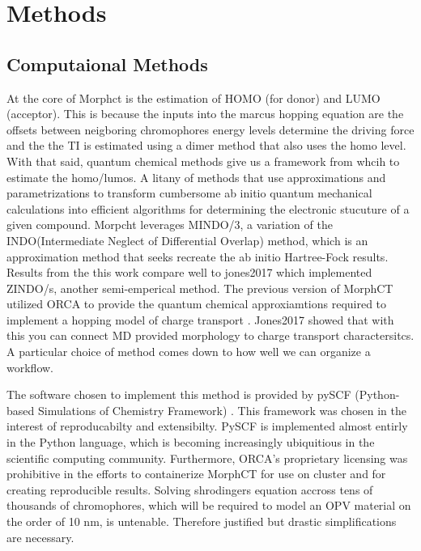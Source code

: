 \chapter{Methods}
\label{chap:methods}


\section{Computaional Methods}

At the core of Morphct is the estimation of HOMO (for donor) and LUMO (acceptor). This is because 
the inputs into the marcus hopping equation are the offsets between neigboring  chromophores energy levels
determine the driving force and the the TI is estimated using a dimer method that also uses the homo level. 
With that said, quantum chemical methods give us a framework from whcih to estimate the homo/lumos. A litany of
methods that use approximations and parametrizations to transform cumbersome ab initio quantum mechanical 
calculations into efficient algorithms for determining the electronic stucuture of a given compound. Morpcht 
leverages MINDO/3, a variation of the INDO(Intermediate Neglect of Differential Overlap) method,
which is an approximation method that seeks recreate the ab initio Hartree-Fock results\cite{Thiel2014}. Results
from the this work compare well to jones2017 which implemented ZINDO/s, another semi-emperical method. The
previous version of MorphCT utilized ORCA to provide the quantum chemical approxiamtions required to implement
a hopping model of charge transport \cite{Neese2012b}. Jones2017 showed that with this you can connect MD
provided morphology to charge transport charactersitcs. A particular 
choice of method comes down to how well we can organize a workflow. 

\indent The software chosen to implement this method is
provided by pySCF (Python-based Simulations of Chemistry Framework) \cite{Sun2018a}. This framework
was chosen in the interest of reproducabilty and extensibilty. PySCF is implemented almost entirly in the Python 
language, which is becoming increasingly ubiquitious in the scientific computing community. Furthermore,
ORCA's proprietary licensing was prohibitive in the efforts to containerize MorphCT for use on cluster and for
creating reproducible results. 
Solving shrodingers equation accross tens of thousands of 
chromophores, which will be required to model an OPV material on the order of 10 nm, is untenable. Therefore
justified but drastic simplifications are necessary. 
\newline \indent

